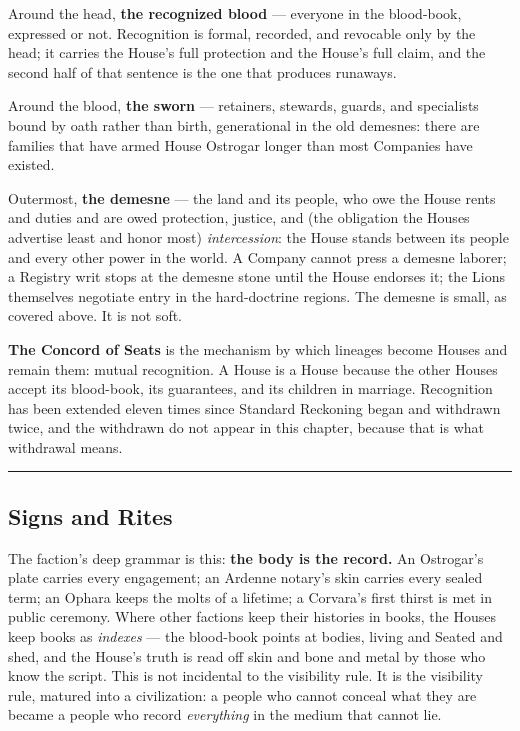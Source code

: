 Around the head, \textbf{the recognized blood} --- everyone in the blood-book, expressed or not. Recognition is formal, recorded, and revocable only by the head; it carries the House's full protection and the House's full claim, and the second half of that sentence is the one that produces runaways.

Around the blood, \textbf{the sworn} --- retainers, stewards, guards, and specialists bound by oath rather than birth, generational in the old demesnes: there are families that have armed House Ostrogar longer than most Companies have existed.

Outermost, \textbf{the demesne} --- the land and its people, who owe the House rents and duties and are owed protection, justice, and (the obligation the Houses advertise least and honor most) \textit{intercession}: the House stands between its people and every other power in the world. A Company cannot press a demesne laborer; a Registry writ stops at the demesne stone until the House endorses it; the Lions themselves negotiate entry in the hard-doctrine regions. The demesne is small, as covered above. It is not soft.

\textbf{The Concord of Seats} is the mechanism by which lineages become Houses and remain them: mutual recognition. A House is a House because the other Houses accept its blood-book, its guarantees, and its children in marriage. Recognition has been extended eleven times since Standard Reckoning began and withdrawn twice, and the withdrawn do not appear in this chapter, because that is what withdrawal means.

\medskip\hrule\medskip

\subsection{Signs and Rites}

The faction's deep grammar is this: \textbf{the body is the record.} An Ostrogar's plate carries every engagement; an Ardenne notary's skin carries every sealed term; an Ophara keeps the molts of a lifetime; a Corvara's first thirst is met in public ceremony. Where other factions keep their histories in books, the Houses keep books as \textit{indexes} --- the blood-book points at bodies, living and Seated and shed, and the House's truth is read off skin and bone and metal by those who know the script. This is not incidental to the visibility rule. It is the visibility rule, matured into a civilization: a people who cannot conceal what they are became a people who record \textit{everything} in the medium that cannot lie.

